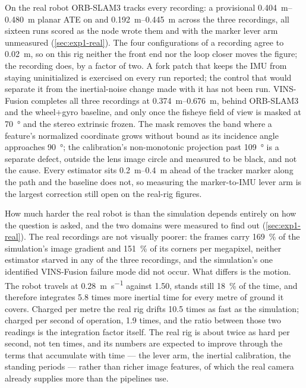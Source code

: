 On the real robot ORB-SLAM3 tracks every recording: a provisional
\SIrange{0.404}{0.480}{\metre} planar ATE on  and
\SIrange{0.192}{0.445}{\metre} across the three  recordings, all
sixteen runs scored as the node wrote them and with the marker lever arm
unmeasured (\cref{sec:exp1-real}). The four configurations of a 
recording agree to \SI{0.02}{\metre}, so on this rig neither the front end nor
the loop closer moves the figure; the recording does, by a factor of two. A
fork patch that keeps the IMU from staying uninitialized is exercised on every
run reported; the control that would separate it from the inertial-noise change
made with it has not been run.
VINS-Fusion completes all three  recordings at
\SIrange{0.374}{0.676}{\metre}, behind ORB-SLAM3 and the wheel+gyro
baseline, and only once the fisheye field of view is masked at
\SI{70}{\degree} and the stereo extrinsic frozen. The mask removes the band
where a feature's normalized coordinate grows without bound as its incidence
angle approaches \SI{90}{\degree}; the calibration's non-monotonic projection
past \SI{109}{\degree} is a separate defect, outside the lens image circle and
measured to be black, and not the cause.
Every estimator sits \SIrange{0.2}{0.4}{\metre} ahead of the
tracker marker along the path and the baseline does not, so measuring the
marker-to-IMU lever arm is the largest correction still open on the real-rig
figures.

How much harder the real robot is than the simulation depends entirely on how
the question is asked, and the two domains were measured to find out
(\cref{sec:exp1-real}). The real recordings are not visually poorer: the frames
carry \SI{169}{\percent} of the simulation's image gradient and
\SI{151}{\percent} of its corners per megapixel, neither estimator starved in
any of the three recordings, and the simulation's one identified VINS-Fusion
failure mode did not occur. What differs is the motion. The robot travels at
\SI{0.28}{\metre\per\second} against \SI{1.50}{}, stands still
\SI{18}{\percent} of the time, and therefore integrates \num{5.8} times more
inertial time for every metre of ground it covers. Charged per metre the real
rig drifts \num{10.5} times as fast as the simulation; charged per second of
operation, \num{1.9} times, and the ratio between those two readings is the
integration factor itself. The real rig is about twice as hard per second, not
ten times, and its numbers are expected to improve through the terms that
accumulate with time --- the lever arm, the inertial calibration, the standing periods ---
rather than richer image features, of which the real camera already supplies
more than the pipelines use.

